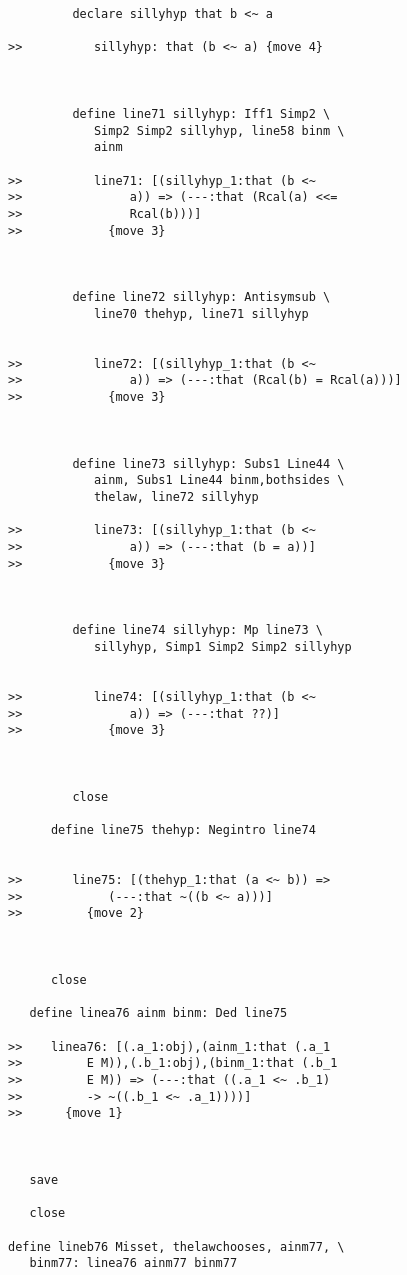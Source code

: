 \documentclass[12pt]{article}
\begin{document}
\begin{verbatim}
         declare sillyhyp that b <~ a

>>          sillyhyp: that (b <~ a) {move 4}



         define line71 sillyhyp: Iff1 Simp2 \
            Simp2 Simp2 sillyhyp, line58 binm \
            ainm

>>          line71: [(sillyhyp_1:that (b <~
>>               a)) => (---:that (Rcal(a) <<=
>>               Rcal(b)))]
>>            {move 3}



         define line72 sillyhyp: Antisymsub \
            line70 thehyp, line71 sillyhyp


>>          line72: [(sillyhyp_1:that (b <~
>>               a)) => (---:that (Rcal(b) = Rcal(a)))]
>>            {move 3}



         define line73 sillyhyp: Subs1 Line44 \
            ainm, Subs1 Line44 binm,bothsides \
            thelaw, line72 sillyhyp

>>          line73: [(sillyhyp_1:that (b <~
>>               a)) => (---:that (b = a))]
>>            {move 3}



         define line74 sillyhyp: Mp line73 \
            sillyhyp, Simp1 Simp2 Simp2 sillyhyp


>>          line74: [(sillyhyp_1:that (b <~
>>               a)) => (---:that ??)]
>>            {move 3}



         close

      define line75 thehyp: Negintro line74


>>       line75: [(thehyp_1:that (a <~ b)) =>
>>            (---:that ~((b <~ a)))]
>>         {move 2}



      close

   define linea76 ainm binm: Ded line75

>>    linea76: [(.a_1:obj),(ainm_1:that (.a_1
>>         E M)),(.b_1:obj),(binm_1:that (.b_1
>>         E M)) => (---:that ((.a_1 <~ .b_1)
>>         -> ~((.b_1 <~ .a_1))))]
>>      {move 1}



   save

   close

define lineb76 Misset, thelawchooses, ainm77, \
   binm77: linea76 ainm77 binm77


\end{verbatim}
\end{document}
